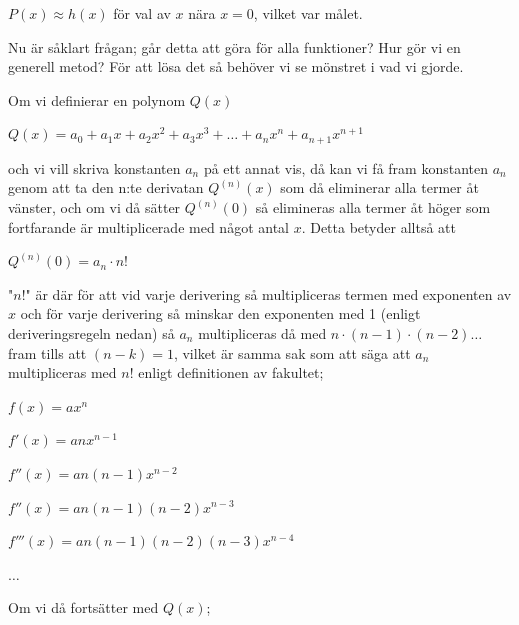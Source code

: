 \documentclass[10pt, a4paper]{amsart}
\begin{document}
$ P(x) \approx h(x) $ för val av $ x $ nära $ x = 0 $, vilket var målet.
\bigskip

Nu är såklart frågan; går detta att göra för alla funktioner? Hur gör vi en generell metod? 
För att lösa det så behöver vi se mönstret i vad vi gjorde.
\bigskip

Om vi definierar en polynom $ Q(x) $
\vspace{24pt plus 4pt minus 4pt}

\hspace{5ex}
$ Q(x) = a_0 + a_1x + a_2x^2 + a_3x^3 + \dotso + a_nx^n + a_{n+1}x^{n+1} $
\bigskip
\bigskip

och vi vill skriva konstanten $ a_n $ på ett annat vis, då kan vi få fram konstanten $ a_n $ genom att ta den n:te derivatan $ Q^{(n)}(x) $ som då eliminerar alla termer åt vänster,
och om vi då sätter $ Q^{(n)}(0) $ så elimineras alla termer åt höger som fortfarande är multiplicerade med något antal $ x $. Detta betyder alltså att
\vspace{24pt plus 4pt minus 4pt}

\hspace{5ex}
$ Q^{(n)}(0) = a_n \cdot n! $
\vspace{24pt plus 4pt minus 4pt}

"$ n! $" är där för att vid varje derivering så multipliceras termen med exponenten av $ x $ och för varje derivering så minskar den exponenten med 1 (enligt deriveringsregeln nedan) 
så $ a_n $ multipliceras då med $ n \cdot (n-1) \cdot (n-2) \dotso $ fram tills att $ (n - k) = 1 $,
vilket är samma sak som att säga att $ a_n $ multipliceras med $ n! $ enligt definitionen av fakultet;
\vspace{24pt plus 4pt minus 4pt}

\hspace{5ex}
$ f(x) = ax^n $

\hspace{5ex}
$ f'(x) = anx^{n-1} $

\hspace{5ex}
$ f''(x) = an(n-1)x^{n-2} $

\hspace{5ex}
$ f''(x) = an(n-1)(n-2)x^{n-3} $

\hspace{5ex}
$ f'''(x) = an(n-1)(n-2)(n-3)x^{n-4} $

\hspace{5ex}
$ \dotso $
\vspace{24pt plus 4pt minus 4pt}

Om vi då fortsätter med $ Q(x) $;
\vspace{24pt plus 4pt minus 4pt}
\end{document}
